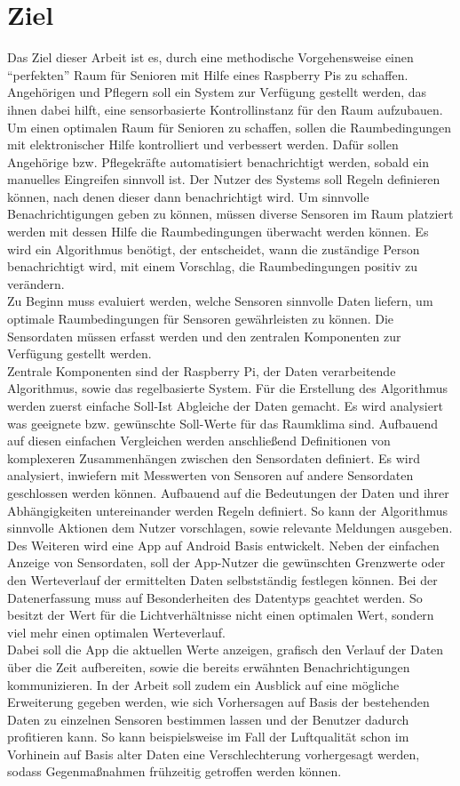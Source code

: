\section{Ziel}
Das Ziel dieser Arbeit ist es, durch eine methodische Vorgehensweise einen ``perfekten'' Raum für Senioren mit Hilfe eines Raspberry Pis zu schaffen. Angehörigen und Pflegern soll ein System zur Verfügung gestellt werden, das ihnen dabei hilft, eine sensorbasierte Kontrollinstanz für den Raum aufzubauen.\\
Um einen optimalen Raum für Senioren zu schaffen, sollen die Raumbedingungen mit elektronischer Hilfe kontrolliert und verbessert werden.
Dafür sollen Angehörige bzw. Pflegekräfte automatisiert benachrichtigt werden, sobald ein manuelles Eingreifen sinnvoll ist. Der Nutzer des Systems soll Regeln definieren können, nach denen dieser dann benachrichtigt wird.
Um sinnvolle Benachrichtigungen geben zu können, müssen diverse Sensoren im Raum platziert werden mit dessen Hilfe die Raumbedingungen überwacht werden können. Es wird ein Algorithmus benötigt, der entscheidet, wann die zuständige Person benachrichtigt wird, mit einem Vorschlag, die Raumbedingungen positiv zu verändern.\\
Zu Beginn muss evaluiert werden, welche Sensoren sinnvolle Daten liefern, um optimale Raumbedingungen für Sensoren gewährleisten zu können. Die Sensordaten müssen erfasst werden und den zentralen Komponenten zur Verfügung gestellt werden.\\
Zentrale Komponenten sind der Raspberry Pi, der Daten verarbeitende Algorithmus, sowie das regelbasierte System.
Für die Erstellung des Algorithmus werden zuerst einfache Soll-Ist Abgleiche der Daten gemacht. Es wird analysiert was geeignete bzw. gewünschte Soll-Werte für das Raumklima sind. Aufbauend auf diesen einfachen Vergleichen werden anschließend Definitionen von komplexeren Zusammenhängen zwischen den Sensordaten definiert. Es wird analysiert, inwiefern mit Messwerten von Sensoren auf andere Sensordaten geschlossen werden können. Aufbauend auf die Bedeutungen der Daten und ihrer Abhängigkeiten untereinander werden Regeln definiert. So kann der Algorithmus sinnvolle Aktionen dem Nutzer vorschlagen, sowie relevante Meldungen ausgeben.\\
Des Weiteren wird eine App auf Android Basis entwickelt. Neben der einfachen Anzeige von Sensordaten, soll der App-Nutzer die gewünschten Grenzwerte oder den Werteverlauf der ermittelten Daten selbstständig festlegen können. Bei der Datenerfassung muss auf Besonderheiten des Datentyps geachtet werden. So besitzt der Wert für die Lichtverhältnisse nicht einen optimalen Wert, sondern viel mehr einen optimalen Werteverlauf.\\
Dabei soll die App die aktuellen Werte anzeigen, grafisch den Verlauf der Daten über die Zeit aufbereiten, sowie die bereits erwähnten Benachrichtigungen kommunizieren.
In der Arbeit soll zudem ein Ausblick auf eine mögliche Erweiterung gegeben werden, wie sich Vorhersagen auf Basis der bestehenden Daten zu einzelnen Sensoren bestimmen lassen und der Benutzer dadurch profitieren kann. So kann beispielsweise im Fall der Luftqualität schon im Vorhinein auf Basis alter Daten eine Verschlechterung vorhergesagt werden, sodass Gegenmaßnahmen frühzeitig getroffen werden können.
